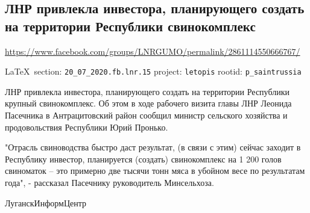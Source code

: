  
 
\subsection{ЛНР привлекла инвестора, планирующего создать на территории Республики свинокомплекс}
\url{https://www.facebook.com/groups/LNRGUMO/permalink/2861114550666767/}
  
\vspace{0.5cm}
{\small\LaTeX~section: \verb|20_07_2020.fb.lnr.15| project: \verb|letopis| rootid: \verb|p_saintrussia|}
\vspace{0.5cm}
  
ЛНР привлекла инвестора, планирующего создать на территории Республики крупный
свинокомплекс. Об этом в ходе рабочего визита главы ЛНР Леонида Пасечника в
Антрацитовский район сообщил министр сельского хозяйства и продовольствия
Республики Юрий Пронько.

"Отрасль свиноводства быстро даст результат, (в связи с этим) сейчас заходит в
Республику инвестор, планируется (создать) свинокомплекс на 1 200 голов
свиноматок – это примерно две тысячи тонн мяса в убойном весе по результатам
года", - рассказал Пасечнику руководитель Минсельхоза.

ЛуганскИнформЦентр

